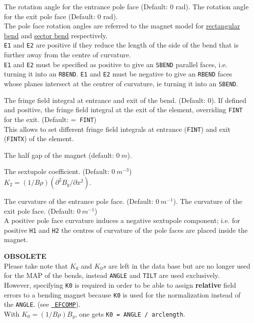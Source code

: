\begin{madlist}
    The rotation angle for the entrance pole face (Default: 0 rad). 
    The rotation angle for the exit pole face (Default: 0 rad). \\
   The pole face rotation angles are referred to the magnet model for
   \href{local_system.html#rbend}{rectangular bend} and
   \href{local_system.html#sbend}{sector bend} respectively. \\
   {\tt E1} and {\tt E2} are positive if they reduce the length of the
   side of the bend that is further away from the centre of
   curvature. \\
   {\tt E1} and {\tt E2} must be specified as positive to give an {\tt SBEND} 
   parallel faces, i.e. turning it into an {\tt RBEND}. {\tt E1} and {\tt E2} 
   must be negative to give an {\tt RBEND} faces whose planes intersect at the 
   centrer of curvature, ie turning it into an {\tt SBEND}. 

    The fringe field integral at entrance and exit of the
   bend. (Default:  0). 
    If defined and positive, the fringe field integral at
   the exit of the element, overriding {\tt FINT} for the exit. (Default: ={\tt 
   FINT}) \\ 
   This allows to set different fringe field integrals at entrance
   ({\tt FINT}) and exit ({\tt FINTX}) of the element.  

    The half gap of the magnet (default: $0\ m$). 

    The sextupole coefficient. (Default: $0\ m^{-3}$) \\ 
   $K_2 = (1/B\rho) (\partial^2 B_y / \partial x^2)$.   

   The curvature of the entrance pole face. 
   (Default: $0\ m^{-1}$).   
    The curvature of the exit pole face. (Default: $0\ m^{-1}$) \\
   A positive pole face curvature induces a negative sextupole
   component; i.e. for positive {\tt H1} and {\tt H2} the centres of curvature 
   of the pole faces are placed inside the magnet. 

    {\bf OBSOLETE} \\
   Please take note that $K_0$ and $K_0s$ are left in the
   data base but are no longer used for the MAP of the bends,
   instead {\tt ANGLE} and {\tt TILT} are used exclusively. \\
   However, specifying {\tt K0} is required in order to be able to assign {\bf 
   relative} field errors to a bending magnet because {\tt K0} is used for the 
   normalization instead of the {\tt ANGLE}. (see \hyperref[sec:efcomp]{\tt 
   EFCOMP}).\\
   With $K_0 = (1 / B \rho) B_y$, one gets {\tt K0 = ANGLE / arclength}.


\end{madlist}
